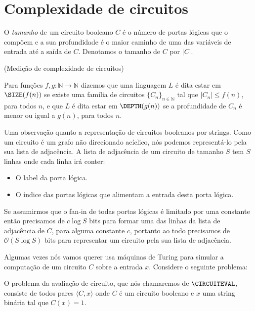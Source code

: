 \section{Complexidade de circuitos} \label{section_circuit_complexity}

O \emph{tamanho} de um circuito booleano $C$ é o número de portas lógicas que o compõem e a sua profundidade é o maior caminho de uma das variáveis de entrada até a saída de $C$. Denotamos o tamanho de $C$ por $\lvert C \rvert$. 

\begin{defi}(Medição de complexidade de circuitos)

Para funções $f, g : \mathbb{N} \to \mathbb{N}$ dizemos que uma linguagem $L$ é dita estar em $\SIZE(f(n))$ se existe uma família de circuitos $\{C_{n}\}_{n \in \mathbb{N}}$ tal que $\lvert C_{n} \rvert \leq f(n)$, para todos $n$, e que $L$ é dita estar em $\DEPTH(g(n))$ se a profundidade de $C_{n}$ é menor ou igual a $g(n)$, para todos $n$.

\end{defi}

Uma observação quanto a representação de circuitos booleanos por strings. Como um circuito é um grafo não direcionado acíclico, nós podemos representá-lo pela sua lista de adjacência. A lista de adjacência de um circuito de tamanho $S$ tem $S$ linhas onde cada linha irá conter:

\begin{itemize}

\item O label da porta lógica.

\item O índice das portas lógicas que alimentam a entrada desta porta lógica.

\end{itemize}

Se assumirmos que o fan-in de todas portas lógicas é limitado por uma constante então precisamos de $c\log S$ bits para formar uma das linhas da lista de adjacência de $C$, para alguma constante $c$, portanto ao todo precisamos de $\mathcal{O}(S\log S)$ bits para representar um circuito pela sua lista de adjacência.

Algumas vezes nós vamos querer usa máquinas de Turing para simular a computação de um circuito $C$ sobre a entrada $x$. Considere o seguinte problema:

\begin{defi} 

O problema da avaliação de circuito, que nós chamaremos de $\CIRCUITEVAL$, consiste de todos pares $\langle C, x \rangle$ onde $C$ é um circuito booleano e $x$ uma string binária tal que $C(x) = 1$. 

\end{defi}

